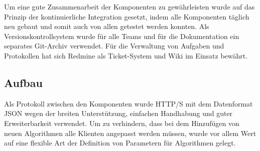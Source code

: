Um eine gute Zusammenarbeit der Komponenten zu gewährleisten wurde auf das Prinzip der kontinuierliche Integration gesetzt, indem alle Komponenten täglich neu gebaut und somit auch von allen getestet werden konnten.
Als Versionskontrollsystem wurde für alle Teams und für die Dokumentation ein separates Git-Archiv verwendet.    Für die Verwaltung von Aufgaben und Protokollen hat sich Redmine als Ticket-System und Wiki im Einsatz bewährt.

\subsection*{Aufbau}
Als Protokoll zwischen den Komponenten wurde HTTP/S mit dem Datenformat JSON wegen der breiten Unterstützung, einfachen Handhabung und guter Erweiterbarkeit verwendet. Um zu verhindern, dass bei dem Hinzufügen von neuen Algorithmen alle Klienten angepasst werden müssen, wurde vor allem Wert auf eine flexible Art der Definition von Parametern für Algorithmen gelegt.

\clearpage